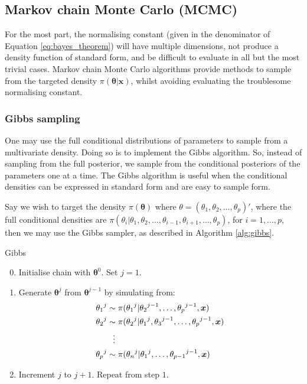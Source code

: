 \subsection{Markov chain Monte Carlo (MCMC)}
\label{ssec:mcmc}

For the most part, the normalising constant (given in the denominator of Equation \eqref{eq:bayes_theorem}) will have multiple dimensions, not produce a density function of standard form, and be difficult to evaluate in all but the most trivial cases. Markov chain Monte Carlo algorithms provide methods to sample from the targeted density $\pi(\bm{\theta}|\bm{x})$, whilst avoiding evaluating the troublesome normalising constant.

\subsubsection{Gibbs sampling}
\label{sssec:gibbs_sampling}
One may use the full conditional distributions of parameters to sample from a multivariate density. Doing so is to implement the Gibbs algorithm. So, instead of sampling from the full posterior, we sample from the conditional posteriors of the parameters one at a time. The Gibbs algorithm is useful when the conditional densities can be expressed in standard form and are easy to sample form.

Say we wish to target the density $\pi(\bm{\theta})$ where $\theta = (\theta_1, \theta_2, \dots, \theta_p)'$, where the full conditional densities are $\pi(\theta_i|\theta_1, \theta_2, \dots, \theta_{i-1}, \theta_{i+1}, \dots, \theta_p)$, for $i=1,\dots,p$, then we may use the Gibbs sampler, as described in Algorithm \ref{alg:gibbs}.

\begin{algorithm}
\caption{Gibbs}
\label{alg:gibbs}
\begin{enumerate}
    \setcounter{enumi}{-1}
    \item Initialise chain with $\bm{\theta}^{0}$. Set $j=1$.
    \item Generate $\bm{\theta}^{j}$ from $\bm{\theta}^{j-1}$ by simulating from:
    \begin{align*}
            {\theta_1}^{j} &\sim \pi({\theta_1}^{j}|{\theta_2}^{j-1},\dots,{\theta_p}^{j-1},\bm{x})\\
            {\theta_2}^{j} &\sim \pi({\theta_2}^{j}|{\theta_1}^{j}, {\theta_3}^{j-1}, \dots, {\theta_p}^{j-1},\bm{x})\\
            &\hspace{0.25cm}\vdots \\
            {\theta_p}^{j} &\sim \pi({\theta_n}^{j}|{\theta_1}^{j}, \dots, {\theta_{p-1}}^{j-1},\bm{x})
    \end{align*}
    \item Increment $j$ to $j+1$. Repeat from step $1$.
\end{enumerate}
\end{algorithm}

